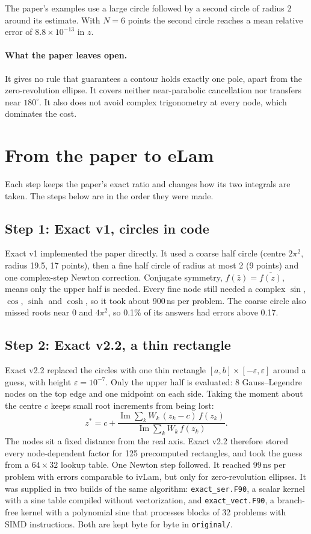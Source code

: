 \documentclass[11pt]{article}
\newcommand{\code}[1]{\texttt{#1}}
\begin{document}
The paper's examples use a large circle followed by a second circle of radius 2 around its estimate. With $N=6$ points the second circle reaches a mean relative error of $8.8\times10^{-13}$ in $z$.

\paragraph{What the paper leaves open.} It gives no rule that guarantees a contour holds exactly one pole, apart from the zero-revolution ellipse. It covers neither near-parabolic cancellation nor transfers near $180^\circ$. It also does not avoid complex trigonometry at every node, which dominates the cost.

\section{From the paper to eLam}

Each step keeps the paper's exact ratio and changes how its two integrals are taken. The steps below are in the order they were made.

\subsection*{Step 1: Exact v1, circles in code}
Exact v1 implemented the paper directly. It used a coarse half circle (centre $2\pi^2$, radius 19.5, 17 points), then a fine half circle of radius at most 2 (9 points) and one complex-step Newton correction. Conjugate symmetry, $f(\bar z) = \overline{f(z)}$, means only the upper half is needed. Every fine node still needed a complex $\sin$, $\cos$, $\sinh$ and $\cosh$, so it took about 900\,ns per problem. The coarse circle also missed roots near 0 and $4\pi^2$, so 0.1\% of its answers had errors above 0.17.

\subsection*{Step 2: Exact v2.2, a thin rectangle}
Exact v2.2 replaced the circles with one thin rectangle $[a,b]\times[-\varepsilon,\varepsilon]$ around a guess, with height $\varepsilon = 10^{-7}$. Only the upper half is evaluated: 8 Gauss--Legendre nodes on the top edge and one midpoint on each side. Taking the moment about the centre $c$ keeps small root increments from being lost:
\begin{equation}
  z^* = c + \frac{\operatorname{Im}\sum_k W_k\,(z_k-c)\,f(z_k)}{\operatorname{Im}\sum_k W_k\,f(z_k)}.
\end{equation}
The nodes sit a fixed distance from the real axis. Exact v2.2 therefore stored every node-dependent factor for 125 precomputed rectangles, and took the guess from a $64\times32$ lookup table. One Newton step followed. It reached 99\,ns per problem with errors comparable to ivLam, but only for zero-revolution ellipses. It was supplied in two builds of the same algorithm: \code{exact\_ser.F90}, a scalar kernel with a sine table compiled without vectorization, and \code{exact\_vect.F90}, a branch-free kernel with a polynomial sine that processes blocks of 32 problems with SIMD instructions. Both are kept byte for byte in \code{original/}.
\end{document}
